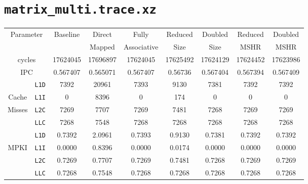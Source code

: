 \documentclass[11pt, swedish, openany]{book}
\begin{document}
\section{\texttt{matrix\_multi.trace.xz}}
\begin{table}[H]
    \begin{tabular}{||c|c||c||c|c||c|c||c|c||}
        \hline
        \multicolumn{2}{||c||}{\multirow{2}{*}{Parameter}} & \multirow{2}{*}{Baseline} & Direct   & Fully       & Reduced  & Doubled  & Reduced  & Doubled  \\
        \multicolumn{2}{||c||}{}                           &                           & Mapped   & Associative & Size     & Size     & MSHR     & MSHR     \\
        \hline
        \multicolumn{2}{||c||}{cycles}                     & 17624045                  & 17696897 & 17624045    & 17625492 & 17624129 & 17624452 & 17623986 \\
        \multicolumn{2}{||c||}{IPC}                        & 0.567407                  & 0.565071 & 0.567407    & 0.56736  & 0.567404 & 0.567394 & 0.567409 \\
        \hline
                                            & \texttt{L1D} & 7392                      & 20961    & 7393        & 9130     & 7381     & 7392     & 7392     \\
        Cache                               & \texttt{L1I} & 0                         & 8396     & 0           & 174      & 0        & 0        & 0        \\
        Misses                              & \texttt{L2C} & 7269                      & 7707     & 7269        & 7481     & 7268     & 7269     & 7269     \\
                                            & \texttt{LLC} & 7268                      & 7548     & 7268        & 7268     & 7268     & 7268     & 7268     \\
        \hline
                                            & \texttt{L1D} & 0.7392                    & 2.0961   & 0.7393      & 0.9130   & 0.7381   & 0.7392   & 0.7392   \\
        \multirow{2}{*}{MPKI}               & \texttt{L1I} & 0.0000                    & 0.8396   & 0.0000      & 0.0174   & 0.0000   & 0.0000   & 0.0000   \\
                                            & \texttt{L2C} & 0.7269                    & 0.7707   & 0.7269      & 0.7481   & 0.7268   & 0.7269   & 0.7269   \\
                                            & \texttt{LLC} & 0.7268                    & 0.7548   & 0.7268      & 0.7268   & 0.7268   & 0.7268   & 0.7268   \\

\end{tabular}
\end{table}
\end{document}
